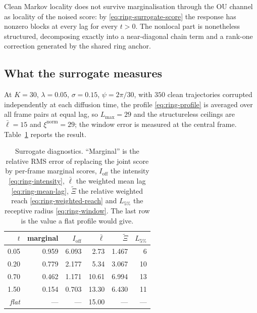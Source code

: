 \begin{proposition}
\label{prop:ring-surrogate-conclusion}
Clean Markov locality does not survive marginalisation through the OU channel
as locality of the noised score: by \eqref{eq:ring-surrogate-score} the
response has nonzero blocks at every lag for every $t > 0$. The nonlocal part
is nonetheless structured, decomposing exactly into a near-diagonal chain term
and a rank-one correction generated by the shared ring anchor.
\end{proposition}

\subsection{What the surrogate measures}\label{sec:ring-surrogate-measurements}

At $K = 30$, $\lambda = 0.05$, $\sigma = 0.15$, $\psi = 2\pi/30$, with $350$
clean trajectories corrupted independently at each diffusion time, the profile
\eqref{eq:ring-profile} is averaged over all frame pairs at equal lag, so
$L_{\max} = 29$ and the structureless ceilings are $\bar\ell = 15$ and
$\xi^{\mathrm{norm}} = 29$; the window error is measured at the central frame.
Table~\ref{tab:ring-surrogate} reports the result.

\begin{table}[t]\centering
\caption{Surrogate diagnostics. ``Marginal'' is the relative RMS error of
replacing the joint score by per-frame marginal scores, $I_{\mathrm{off}}$ the
intensity \eqref{eq:ring-intensity}, $\bar\ell$ the weighted mean lag
\eqref{eq:ring-mean-lag}, $\widetilde\Xi$ the relative weighted reach
\eqref{eq:ring-weighted-reach} and $L_{5\%}$ the receptive radius
\eqref{eq:ring-window}. The last row is the value a flat profile would give.}
\label{tab:ring-surrogate}
\begin{tabular}{@{}rrrrrr@{}}
\toprule
$t$ & marginal & $I_{\mathrm{off}}$ & $\bar\ell$ & $\widetilde\Xi$ & $L_{5\%}$ \\
\midrule
0.05 & 0.959 & 6.093 & 2.73 & 1.467 & 6 \\
0.20 & 0.779 & 2.177 & 5.34 & 3.067 & 10 \\
0.70 & 0.462 & 1.171 & 10.61 & 6.994 & 13 \\
1.50 & 0.154 & 0.703 & 13.30 & 6.430 & 11 \\
\midrule
\emph{flat} & --- & --- & 15.00 & --- & --- \\
\bottomrule
\end{tabular}
\end{table}

